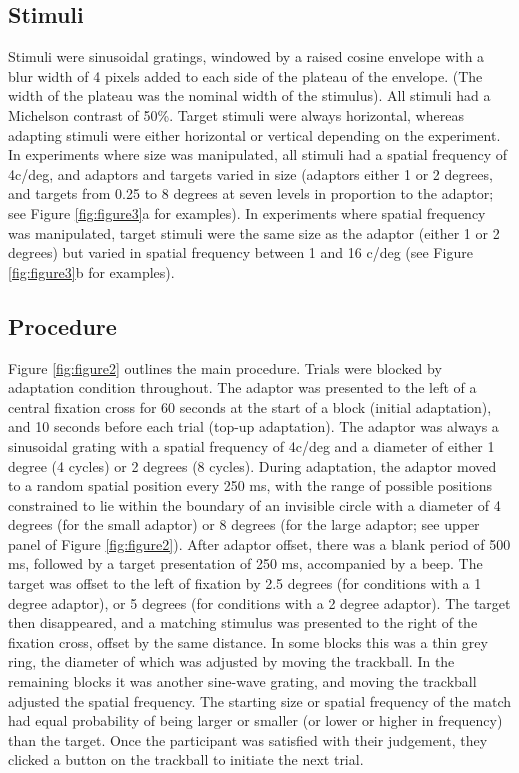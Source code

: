 \documentclass[
]{article}
\begin{document}
\hypertarget{stimuli}{%
\subsection*{Stimuli}\label{stimuli}}

Stimuli were sinusoidal gratings, windowed by a raised cosine envelope with a blur width of 4 pixels added to each side of the plateau of the envelope. (The width of the plateau was the nominal width of the stimulus). All stimuli had a Michelson contrast of 50\%. Target stimuli were always horizontal, whereas adapting stimuli were either horizontal or vertical depending on the experiment. In experiments where size was manipulated, all stimuli had a spatial frequency of 4c/deg, and adaptors and targets varied in size (adaptors either 1 or 2 degrees, and targets from 0.25 to 8 degrees at seven levels in proportion to the adaptor; see Figure \ref{fig:figure3}a for examples). In experiments where spatial frequency was manipulated, target stimuli were the same size as the adaptor (either 1 or 2 degrees) but varied in spatial frequency between 1 and 16 c/deg (see Figure \ref{fig:figure3}b for examples).

\hypertarget{procedure}{%
\subsection*{Procedure}\label{procedure}}

Figure \ref{fig:figure2} outlines the main procedure. Trials were blocked by adaptation condition throughout. The adaptor was presented to the left of a central fixation cross for 60 seconds at the start of a block (initial adaptation), and 10 seconds before each trial (top-up adaptation). The adaptor was always a sinusoidal grating with a spatial frequency of 4c/deg and a diameter of either 1 degree (4 cycles) or 2 degrees (8 cycles). During adaptation, the adaptor moved to a random spatial position every 250 ms, with the range of possible positions constrained to lie within the boundary of an invisible circle with a diameter of 4 degrees (for the small adaptor) or 8 degrees (for the large adaptor; see upper panel of Figure \ref{fig:figure2}). After adaptor offset, there was a blank period of 500 ms, followed by a target presentation of 250 ms, accompanied by a beep. The target was offset to the left of fixation by 2.5 degrees (for conditions with a 1 degree adaptor), or 5 degrees (for conditions with a 2 degree adaptor). The target then disappeared, and a matching stimulus was presented to the right of the fixation cross, offset by the same distance. In some blocks this was a thin grey ring, the diameter of which was adjusted by moving the trackball. In the remaining blocks it was another sine-wave grating, and moving the trackball adjusted the spatial frequency. The starting size or spatial frequency of the match had equal probability of being larger or smaller (or lower or higher in frequency) than the target. Once the participant was satisfied with their judgement, they clicked a button on the trackball to initiate the next trial.
\end{document}
